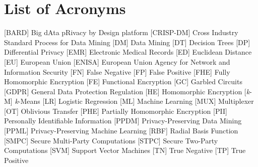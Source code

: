 %

\chapter*{List of Acronyms}
%
\begin{acronym}


 [BARD] {Big dAta pRivacy by Design platform}
 [CRISP-DM] {Cross Industry Standard Process for Data Mining}
 [DM] {Data Mining}
 [DT] {Decision Trees}
 [DP] {Differential Privacy}
 [EMR] {Electronic Medical Records}
 [ED] {Euclidean Distance}
 [EU] {European Union}
 [ENISA] {European Union Agency for Network and Information Security}
 [FN] {False Negative}
 [FP] {False Positive}
 [FHE] {Fully Homomorphic Encryption}
 [FE] {Functional Encryption}
 [GC] {Garbled Circuits}
 [GDPR] {General Data Protection Regulation}
 [HE] {Homomorphic Encryption}
 [\textit{k}-M] {\textit{k}-Means}
 [LR] {Logistic Regression}
 [ML] {Machine Learning}
 [MUX] {Multiplexer}
 [OT] {Oblivious Transfer}
 [PHE] {Partially Homomorphic Encryption}
 [PII] {Personally Identifiable Information}
 [PPDM] {Privacy-Preserving Data Mining}
 [PPML] {Privacy-Preserving Machine Learning}
 [RBF] {Radial Basis Function}
 [SMPC] {Secure Multi-Party Computations}
 [STPC] {Secure Two-Party Computations}
 [SVM] {Support Vector Machines}
 [TN] {True Negative}
 [TP] {True Positive}

\end{acronym}

\cleardoublepage

